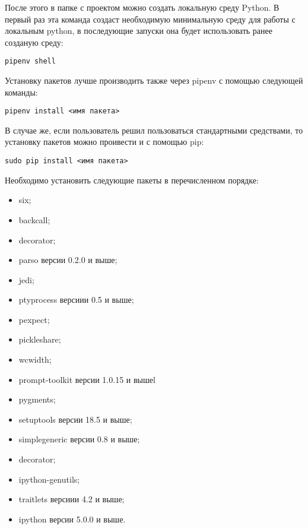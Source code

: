 После этого в папке с проектом можно создать локальную среду Python. В первый раз эта команда создаст необходимую минимальную среду для работы с локальным python, в последующие запуски она будет использовать ранее созданую среду:
\medskip
\begin{lstlisting}[style=Python]
  pipenv shell
\end{lstlisting}
\medskip

Установку пакетов лучше производить также через pipenv с помощью следующей команды:
\medskip
\begin{lstlisting}[style=Python]
  pipenv install <имя пакета>
\end{lstlisting}
\medskip

В случае же, если пользователь решил пользоваться стандартными средствами, то установку пакетов можно проивести и с помощью  pip:
\medskip
\begin{lstlisting}[style=Python]
  sudo pip install <имя пакета>
\end{lstlisting}
\medskip

Необходимо установить следующие пакеты в перечисленном порядке:
\begin{itemize}
\item six;
\item backcall;
\item decorator;
\item parso версии 0.2.0 и выше;
\item jedi;
\item ptyprocess версиии 0.5 и выше;
\item pexpect;
\item pickleshare;
\item wcwidth;
\item prompt-toolkit версии 1.0.15 и вышеl
\item pygments;
\item setuptools версии 18.5 и выше;
\item simplegeneric версии 0.8 и выше;
\item decorator;
\item ipython-genutils;
\item traitlets версиии 4.2 и выше;
\item ipython версии 5.0.0 и выше.
\end{itemize}

